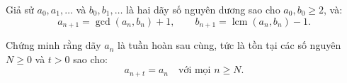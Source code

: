 \ifshowproblem
\begin{problem}\label{example:IMO-2015-SL-P4}
    Giả sử \( a_0, a_1, \ldots \) và \( b_0, b_1, \ldots \) là hai dãy số nguyên dương sao cho \( a_0, b_0 \ge 2 \), và:
    \[
        a_{n+1} = \gcd(a_n, b_n) + 1, \qquad b_{n+1} = \operatorname{lcm}(a_n, b_n) - 1.
    \]

    Chứng minh rằng dãy \( a_n \) là tuần hoàn sau cùng, tức là tồn tại các số nguyên \( N \ge 0 \) và \( t > 0 \) sao cho:
    \[
        a_{n+t} = a_n \quad \text{với mọi } n \ge N.
    \]
\end{problem}
\fi

\footnotemark
{}
\fi